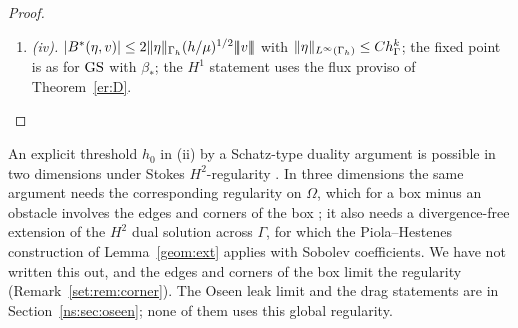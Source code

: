 \begin{proof}
\begin{enumerate}
\item \emph{(iv).} $|B^\ast(\eta,v)|\le2\lVert \eta\rVert_{\Gamma_h}(h/\mu)^{1/2}|\!|\!|v|\!|\!|$ with $\lVert \eta\rVert_{L^\infty(\Gamma_h)}\le Ch_\Gamma^k$; the fixed point is as for $\mathrm{GS}$ with $\beta_\ast$; the $H^1$ statement uses the flux proviso of Theorem~\ref{er:D}.\qedhere
\end{enumerate}
\end{proof}

\begin{remark}\label{ns:rem}
An explicit threshold $h_0$ in (ii) by a Schatz-type duality argument \cite{Schatz1974} is possible in two dimensions under Stokes $H^2$-regularity \cite{PadhiLong2D}. In three dimensions the same argument needs the corresponding regularity on $\Omega$, which for a box minus an obstacle involves the edges and corners of the box \cite{Dauge1989}; it also needs a divergence-free extension of the $H^2$ dual solution across $\Gamma$, for which the Piola--Hestenes construction of Lemma~\ref{geom:ext} applies with Sobolev coefficients. We have not written this out, and the edges and corners of the box limit the regularity (Remark~\ref{set:rem:corner}). %
The Oseen leak limit and the drag statements are in Section~\ref{ns:sec:oseen}; none of them uses this global regularity.
\end{remark}

